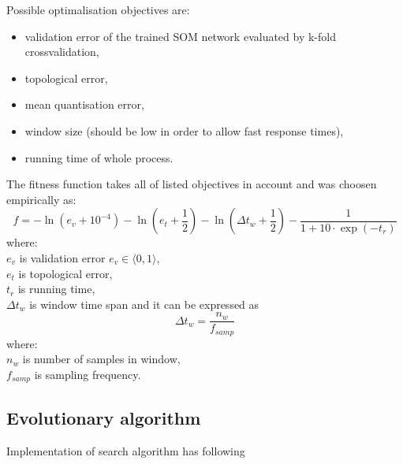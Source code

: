 \documentclass[a4paper,journal]{IEEEtran}
\begin{document}
Possible optimalisation objectives are:
\begin{itemize}
	\item validation error of the trained SOM network evaluated by k-fold
	crossvalidation,
	\item topological error,
	\item mean quantisation error,
	\item window size (should be low in order to allow fast response times),
	\item running time of whole process.
\end{itemize}

The fitness function takes all of listed objectives in account and 
was choosen empirically as:
\[ f = -\ln(e_{v}+10^{-4}) - \ln(e_t + \frac{1}{2}) - 
\ln(\Delta t_w + \frac{1}{2}) - \frac{1}{1+10\cdot \exp(-t_r)} \]
where:\\
$ e_v $ is validation error $ e_v \in \langle 0, 1 \rangle $,\\
$ e_t $ is topological error,\\
$ t_r $ is running time,\\
$ \Delta t_w $ is window time span and it can be expressed as 
\[  \Delta t_w = \frac{n_w}{f_{samp}}  \]
where:\\
$ n_w $ is number of samples in window,\\
$ f_{samp} $ is sampling frequency.

\subsection{Evolutionary algorithm}
Implementation of search algorithm has following 


%
\end{document}
